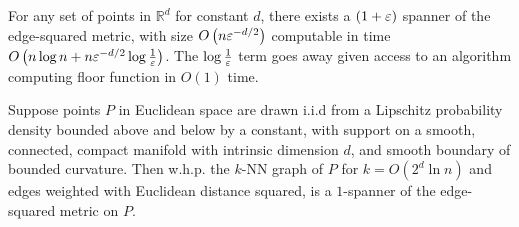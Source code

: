 
\begin{theorem} \label{thm:general-spanner}
  For any set of points in $\mathbb{R}^d$ for constant $d$, there exists a $(1+\varepsilon)$
  spanner of the edge-squared metric, 
  with size $O\left(n\varepsilon^{-d/2} \right)$ computable in time
  $O\left(n \log n + n\varepsilon^{-d/2}\log{\frac{1}{\varepsilon}}\right)$. The
  $\log{\frac{1}{\varepsilon}}$ term goes away given access to an algorithm
computing floor function
in $O(1)$ time.
\end{theorem}

\begin{theorem} \label{thm:distribution-spanner}
Suppose points $P$ in Euclidean space are drawn i.i.d from a Lipschitz probability density bounded
above and below by a constant, with support on a
smooth, connected, compact manifold with intrinsic dimension $d$,
  and smooth
  boundary of bounded curvature. Then w.h.p. the $k$-NN graph of
  $P$ for $k = O(2^d \ln n)$ and edges weighted with Euclidean
  distance squared, is a $1$-spanner of the edge-squared
  metric on $P$.
\end{theorem}
